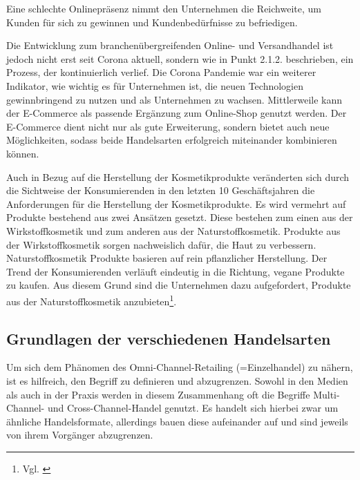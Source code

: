 Eine schlechte Onlinepräsenz nimmt den Unternehmen die Reichweite, um Kunden für sich zu gewinnen und Kundenbedürfnisse zu befriedigen.
\newline

Die Entwicklung zum branchenübergreifenden Online- und Versandhandel ist jedoch nicht erst seit Corona aktuell, sondern wie in Punkt 2.1.2. beschrieben, ein Prozess, der kontinuierlich verlief. Die Corona Pandemie war ein weiterer Indikator, wie wichtig es für Unternehmen ist, die neuen Technologien gewinnbringend zu nutzen und als Unternehmen zu wachsen.
\newline
Mittlerweile kann der E-Commerce als passende Ergänzung zum Online-Shop genutzt werden. Der E-Commerce dient nicht nur als gute Erweiterung, sondern bietet auch neue Möglichkeiten, sodass beide Handelsarten erfolgreich miteinander kombinieren können.
\newline

Auch in Bezug auf die Herstellung der Kosmetikprodukte veränderten sich durch die Sichtweise der Konsumierenden in den letzten 10 Geschäftsjahren die Anforderungen für die Herstellung der Kosmetikprodukte. Es wird vermehrt auf Produkte bestehend aus zwei Ansätzen gesetzt. Diese bestehen zum einen aus der Wirkstoffkosmetik und zum anderen aus der Naturstoffkosmetik. Produkte aus der Wirkstoffkosmetik sorgen nachweislich dafür, die Haut zu verbessern. Naturstoffkosmetik Produkte basieren auf rein pflanzlicher Herstellung. Der Trend der Konsumierenden verläuft eindeutig in die Richtung, vegane Produkte zu kaufen. Aus diesem Grund sind die Unternehmen dazu aufgefordert, Produkte aus der Naturstoffkosmetik anzubieten\footnote{Vgl. \autocite [Online] {Verbraucherzentrale2022}}.


\subsection{Grundlagen der verschiedenen Handelsarten}\label{hauptabschnitt_2_grundlagen}
Um sich dem Phänomen des Omni-Channel-Retailing (=Einzelhandel) zu nähern, ist es hilfreich, den Begriff zu definieren und abzugrenzen. Sowohl in den Medien als auch in der Praxis werden in diesem Zusammenhang oft die Begriffe Multi-Channel- und Cross-Channel-Handel genutzt. Es handelt sich hierbei zwar um ähnliche Handelsformate, allerdings bauen diese aufeinander auf und sind jeweils von ihrem Vorgänger abzugrenzen.

\newpage

